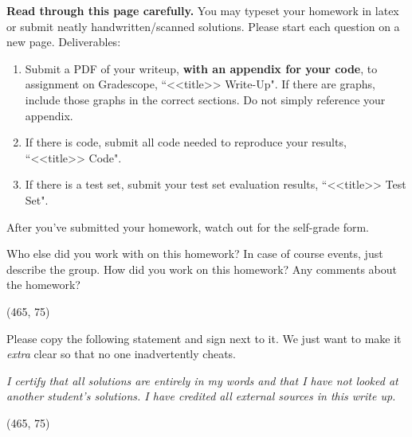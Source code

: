 \documentclass[preview]{standalone}
\begin{document}
\fontsize{12}{15}\selectfont


\textbf{Read through this page carefully.} You may typeset your homework in latex or submit neatly handwritten/scanned solutions. Please start each question on a new page. Deliverables:

\begin{enumerate}
  \item Submit a PDF of your writeup, \textbf{with an appendix for your code}, to assignment on Gradescope, ``<<title>> Write-Up". If there are graphs, include those graphs in the correct sections. Do not simply reference your appendix.
  \item If there is code, submit all code needed to reproduce your results, ``<<title>> Code".
  \item If there is a test set, submit your test set evaluation results, ``<<title>> Test Set".
\end{enumerate}

After you've submitted your homework, watch out for the self-grade form.

\begin{Parts}

\Part Who else did you work with on this homework? In case of course events, just describe the group. How did you work on this homework? Any comments about the homework?

\vspace{15pt}
\framebox(465, 75){}

\Part Please copy the following statement and sign next to it. We just want to make it \textit{extra} clear so that no one inadvertently cheats.

\textit{I certify that all solutions are entirely in my words and that I have not looked at another student's solutions. I have credited all external sources in this write up.}

\vspace{15pt}
\framebox(465, 75){}

\end{Parts}

\pagebreak
\end{document}
